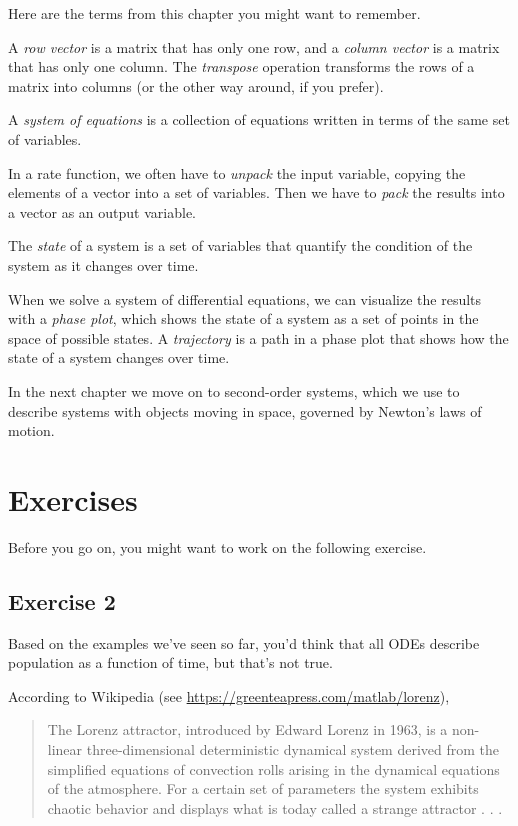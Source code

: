 Here are the terms from this chapter you might want to remember.

A {\em row vector} is a matrix that has only one row, and a {\em column vector} is a matrix that has only one column.
The {\em transpose} operation transforms the rows of a matrix
into columns (or the other way around, if you prefer).

A {\em system of equations} is a collection of equations written in terms of
the same set of variables.

In a rate function, we often have to {\em unpack} the input variable,
copying the elements of a vector into a set of variables.
Then we have to {\em pack} the results into a vector as an output variable.

The {\em state} of a system is a set of variables that quantify the condition of the system as it changes over time.

When we solve a system of differential equations, we can visualize the results with a {\em phase plot}, which shows the state of a system as a set of points in the space of possible states.
A {\em trajectory} is a path in a phase plot that shows how the state of a system changes over time.

In the next chapter we move on to second-order systems, which we use to describe systems
with objects moving in space, governed by Newton's laws of motion.


\section{Exercises}

Before you go on, you might want to work on the following exercise.

\subsection{Exercise 2}


Based on the examples we've seen so far, you'd think that all ODEs describe population as
a function of time, but that's not true.

According to Wikipedia (see \url{https://greenteapress.com/matlab/lorenz}),
\begin{quote}
The Lorenz attractor, introduced by Edward Lorenz in 1963, is a
non-linear three-dimensional deterministic dynamical system derived
from the simplified equations of convection rolls arising in the
dynamical equations of the atmosphere. For a certain set of parameters
the system exhibits chaotic behavior and displays what is today called
a strange attractor . . .
\end{quote}

